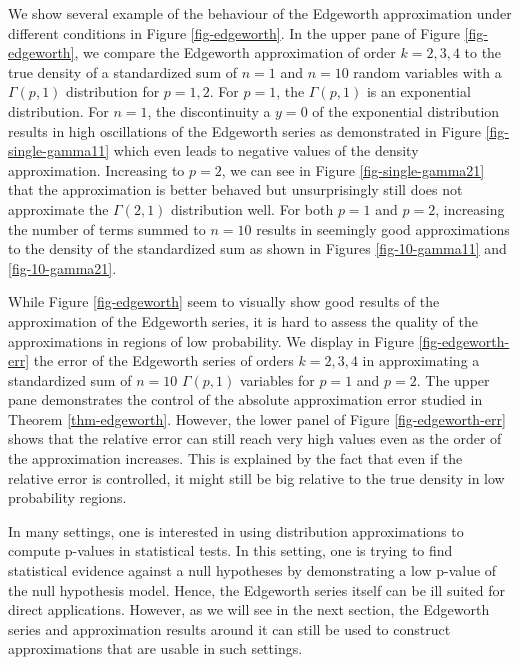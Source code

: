 \begin{example}
    We show several example of the behaviour of the Edgeworth approximation under different conditions in Figure \ref{fig-edgeworth}. In the upper pane of Figure \ref{fig-edgeworth}, we compare the Edgeworth approximation of order $k=2, 3, 4$ to the true density of a standardized sum of $n=1$ and $n=10$ random variables with a $\Gamma(p, 1)$ distribution for $p=1,2$. For $p=1$, the $\Gamma(p, 1)$ is an exponential distribution. For $n = 1$, the discontinuity a $y = 0$ of the exponential distribution results in high oscillations of the Edgeworth series as demonstrated in Figure \ref{fig-single-gamma11} which even leads to negative values of the density approximation. Increasing to $p = 2$, we can see in Figure \ref{fig-single-gamma21} that the approximation is better behaved but unsurprisingly still does not approximate the $\Gamma(2, 1)$ distribution well. For both $p=1$ and $p=2$, increasing the number of terms summed to $n = 10$ results in seemingly good approximations to the density of the standardized sum as shown in Figures \ref{fig-10-gamma11} and \ref{fig-10-gamma21}.

    While Figure \ref{fig-edgeworth} seem to visually show good results of the approximation of the Edgeworth series, it is hard to assess the quality of the approximations in regions of low probability. We display in Figure \ref{fig-edgeworth-err} the error of the Edgeworth series of orders $k=2,3,4$ in approximating a standardized sum of $n=10$ $\Gamma(p, 1)$ variables for $p=1$ and $p=2$. The upper pane demonstrates the control of the absolute approximation error studied in Theorem \ref{thm-edgeworth}. However, the lower panel of Figure \ref{fig-edgeworth-err} shows that the relative error can still reach very high values even as the order of the approximation increases. This is explained by the fact that even if the relative error is controlled, it might still be big relative to the true density in low probability regions.
    
    In many settings, one is interested in using distribution approximations to compute p-values in statistical tests. In this setting, one is trying to find statistical evidence against a null hypotheses by demonstrating a low p-value of the null hypothesis model. Hence, the Edgeworth series itself can be ill suited for direct applications. However, as we will see in the next section, the Edgeworth series and approximation results around it can still be used to construct approximations that are usable in such settings.


\end{example}
